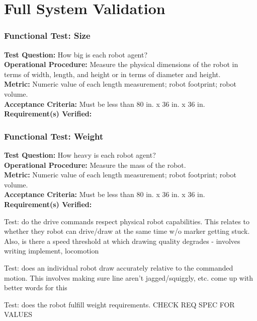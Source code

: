 
\section{Full System Validation}
\label{sec:system_validation}

\subsubsection{Functional Test: Size}
\label{test:sys_ft_size}
\textbf{Test Question:} How big is each robot agent?\\
\textbf{Operational Procedure:} Measure the physical dimensions of the robot in terms of width, length, and height or in terms of diameter and height. \\
\textbf{Metric:} Numeric value of each length measurement; robot footprint; robot volume.\\
\textbf{Acceptance Criteria:} Must be less than 80 in. x 36 in. x 36 in. \\
\textbf{Requirement(s) Verified:} 

\subsubsection{Functional Test: Weight}
\label{test:sys_ft_weight}
\textbf{Test Question:} How heavy is each robot agent?\\
\textbf{Operational Procedure:} Measure the mass of the robot. \\
\textbf{Metric:} Numeric value of each length measurement; robot footprint; robot volume.\\
\textbf{Acceptance Criteria:} Must be less than 80 in. x 36 in. x 36 in. \\
\textbf{Requirement(s) Verified:} 


Test: do the drive commands respect physical robot capabilities. This relates to whether they robot can drive/draw at the same time w/o marker getting stuck. Also, is there a speed threshold at which drawing quality degrades - involves writing implement, locomotion

Test: does an individual robot draw accurately relative to the commanded motion. This involves making sure line aren't jagged/squiggly, etc. come up with better words for this


Test: does the robot fulfill weight requirements. CHECK REQ SPEC FOR VALUES

